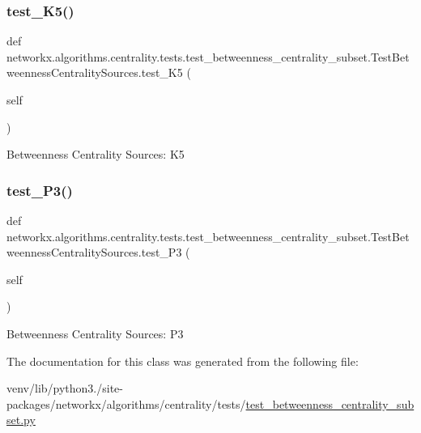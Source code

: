 \subsubsection{\texorpdfstring{test\+\_\+\+K5()}{test\_K5()}}
{\footnotesize\ttfamily def networkx.\+algorithms.\+centrality.\+tests.\+test\+\_\+betweenness\+\_\+centrality\+\_\+subset.\+Test\+Betweenness\+Centrality\+Sources.\+test\+\_\+\+K5 (\begin{DoxyParamCaption}\item[{}]{self }\end{DoxyParamCaption})}

\begin{DoxyVerb}Betweenness Centrality Sources: K5\end{DoxyVerb}
 \mbox{\label{classnetworkx_1_1algorithms_1_1centrality_1_1tests_1_1test__betweenness__centrality__subset_1_1TestBetweennessCentralitySources_a51adf93b4e80411e0c9ed4361212464e}} 
\subsubsection{\texorpdfstring{test\+\_\+\+P3()}{test\_P3()}}
{\footnotesize\ttfamily def networkx.\+algorithms.\+centrality.\+tests.\+test\+\_\+betweenness\+\_\+centrality\+\_\+subset.\+Test\+Betweenness\+Centrality\+Sources.\+test\+\_\+\+P3 (\begin{DoxyParamCaption}\item[{}]{self }\end{DoxyParamCaption})}

\begin{DoxyVerb}Betweenness Centrality Sources: P3\end{DoxyVerb}
 

The documentation for this class was generated from the following file\+:\begin{DoxyCompactItemize}
\item 
venv/lib/python3./site-\/packages/networkx/algorithms/centrality/tests/\hyperlink{test__betweenness__centrality__subset_8py}{test\+\_\+betweenness\+\_\+centrality\+\_\+subset.\+py}\end{DoxyCompactItemize}
